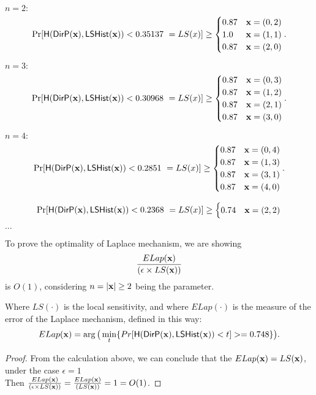 \documentclass{article}
\begin{document}
\newpage
{\small

\noindent $n = 2:$
\[
\Pr[\hlg(\bysinfer{\dataobs}, \ilapmech(\dataobs)) < 0.35137 ~ = LS(x)]
\geq \begin{cases}
	0.87	& \dataobs = (0, 2)\\
%
	1.0		& \dataobs = (1, 1)\\
%
	0.87	& \dataobs = (2, 0)\\
\end{cases}.
\]


\noindent $n = 3:$
\[
\Pr[\hlg(\bysinfer{\dataobs}, \ilapmech(\dataobs)) < 0.30968 ~ = LS(x)]
\geq \begin{cases}
 	0.87
	& \dataobs = (0, 3)\\
%
 	0.87
	& \dataobs = (1, 2)\\
%
 	0.87
	& \dataobs = (2, 1)\\
%
	0.87
	& \dataobs = (3, 0)
\end{cases}.
\]

\noindent $n = 4:$
\[
\Pr[\hlg(\bysinfer{\dataobs}, \ilapmech(\dataobs)) < 0.2851 ~ = LS(x)]
\geq 
\begin{cases}
 	0.87
	& \dataobs = (0, 4)\\
%
 	0.87
	& \dataobs = (1, 3)\\
%
	0.87
	& \dataobs = (3, 1)\\
%
	0.87
	& \dataobs = (4, 0)
\end{cases}.
\]

\[
\Pr[\mathsf{H}(\mathsf{DirP}(\textbf{x}), \mathsf{LSHist}(\textbf{x})) < 0.2368 ~ = LS(x)]
\geq
\begin{cases}
0.74 & \textbf{x} = (2, 2)
\end{cases}
\]




$\dots$

\begin{thm}
To prove the optimality of Laplace mechanism, we are showing 
\[
\frac{ELap(\textbf{x})}{(\epsilon \times LS(\textbf{x}))}
\]
is $O(1)$, considering $n=|\textbf{x}| \geq 2$ being the parameter.

Where $LS(\cdot)$ is the local sensitivity, and where $ELap(\cdot)$ is the measure of the error of the Laplace mechanism, defined in this way:
\[
ELap(\textbf{x}) = \arg\big( \min\limits_{t}\{Pr[\mathsf{H}(\mathsf{DirP}(\textbf{x}), \mathsf{LSHist}(\textbf{x}))< t] >= 0.748\} \big).
\]
\end{thm}

\begin{proof}
From the calculation above, we can conclude that the $ELap(\textbf{x}) = LS(\textbf{x})$, under the case $\epsilon = 1$\\
Then $\frac{ELap(\textbf{x})}{(\epsilon \times LS(\textbf{x}))} = \frac{ELap(\textbf{x})}{(LS(\textbf{x}))} = 1 = O(1)$.


\end{proof}}
\end{document}

